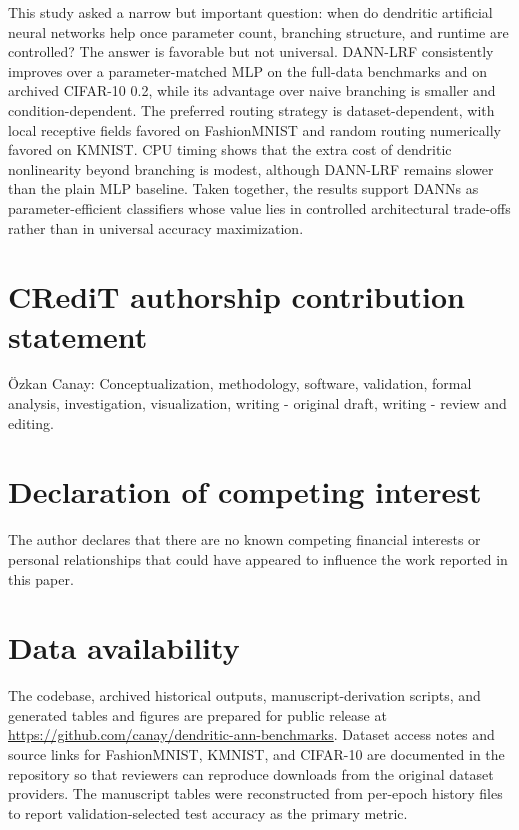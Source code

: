 \documentclass[preprint,12pt]{elsarticle}
\newcommand{\DANNLRF}{\textsc{DANN-LRF}}
\begin{document}
This study asked a narrow but important question: when do dendritic artificial neural networks help once parameter count, branching structure, and runtime are controlled? The answer is favorable but not universal. \DANNLRF{} consistently improves over a parameter-matched MLP on the full-data benchmarks and on archived CIFAR-10 0.2, while its advantage over naive branching is smaller and condition-dependent. The preferred routing strategy is dataset-dependent, with local receptive fields favored on FashionMNIST and random routing numerically favored on KMNIST. CPU timing shows that the extra cost of dendritic nonlinearity beyond branching is modest, although \DANNLRF{} remains slower than the plain MLP baseline. Taken together, the results support DANNs as parameter-efficient classifiers whose value lies in controlled architectural trade-offs rather than in universal accuracy maximization.

\section*{CRediT authorship contribution statement}

{\"O}zkan Canay: Conceptualization, methodology, software, validation, formal analysis, investigation, visualization, writing - original draft, writing - review and editing.

\section*{Declaration of competing interest}

The author declares that there are no known competing financial interests or personal relationships that could have appeared to influence the work reported in this paper.

\section*{Data availability}

The codebase, archived historical outputs, manuscript-derivation scripts, and generated tables and figures are prepared for public release at \url{https://github.com/canay/dendritic-ann-benchmarks}. Dataset access notes and source links for FashionMNIST, KMNIST, and CIFAR-10 are documented in the repository so that reviewers can reproduce downloads from the original dataset providers. The manuscript tables were reconstructed from per-epoch history files to report validation-selected test accuracy as the primary metric.



\end{document}
